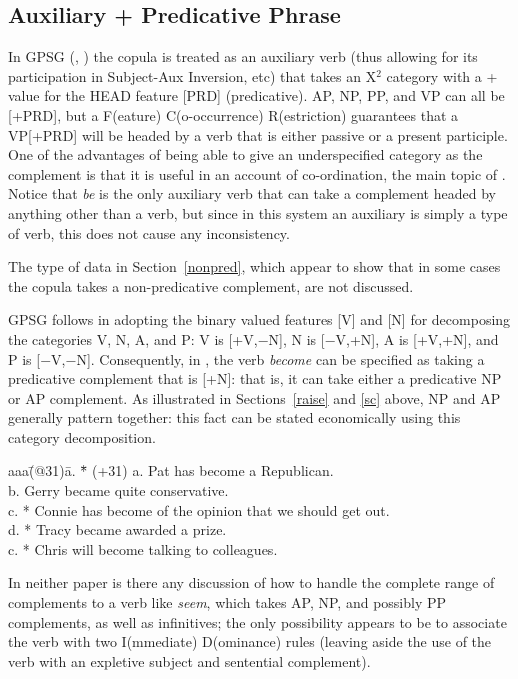 \subsection{Auxiliary + Predicative Phrase}

\label{gpsg}
In GPSG (\cite{gkps85}, \cite{sgww85}) the copula is treated as an
auxiliary verb (thus allowing for its participation in Subject-Aux
Inversion, etc) that takes an X$^{2}$ category with a + value for the HEAD
feature [PRD] (predicative). AP, NP, PP, and VP can all be [+PRD], but a
F(eature) C(o-occurrence) R(estriction) guarantees that a VP[+PRD] will
be headed by a verb that is either passive or a present participle.  One
of the advantages of being able to give an underspecified category as
the complement is that it is useful in an account of co-ordination, the
main topic of \cite{sgww85}. Notice that {\em be} is the only auxiliary
verb that can take a complement headed by anything other than a verb,
but since in this system an auxiliary is simply a type of verb, this
does not cause any inconsistency.

The type of data in Section~\ref{nonpred}, which appear to show that in
some cases the copula takes a non-predicative complement, are not
discussed. 

GPSG follows \cite{ch70} in adopting the binary valued features [V] and
[N] for decomposing the categories V, N, A, and P: V is [+V,$-$N], N is
[$-$V,+N], A is [+V,+N], and P is [$-$V,$-$N]. Consequently, in
\cite[p.141]{sgww85}, the verb {\em become} can be specified as taking a
predicative complement that is [+N]: that is, it can take either a
predicative NP or AP complement. As illustrated in Sections~\ref{raise}
and \ref{sc} above, NP and AP generally pattern together: this fact can
be stated economically using this category decomposition.
\begin{tabbing}
aaa\=(@31)\= a. \= *\= \kill
   \>(+31)\> a. \>  \> Pat has become a Republican. \\
   \>   \> b. \>  \> Gerry became quite conservative. \\
   \>   \> c. \> *\> Connie has become of the opinion that we should
                     get out. \\
   \>   \> d. \> *\> Tracy became awarded a prize. \\
   \>   \> c. \> *\> Chris will become talking to colleagues. 
\end{tabbing}
In neither paper is there any discussion of how to handle the complete
range of complements to a verb like {\em seem}, which takes AP, NP, and
possibly PP complements, as well as infinitives; the only possibility
appears to be to associate the verb with two I(mmediate) D(ominance)
rules (leaving aside the use of the verb with an expletive subject and
sentential complement).

